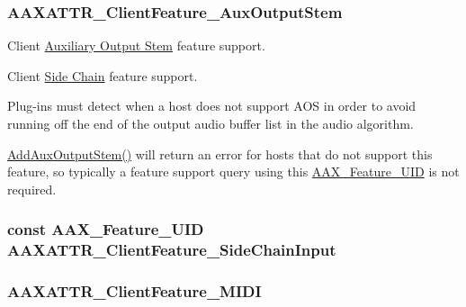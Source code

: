 \subsubsection[{A\+A\+X\+A\+T\+T\+R\+\_\+\+Client\+Feature\+\_\+\+Aux\+Output\+Stem}]{\setlength{\rightskip}{0pt plus 5cm}A\+A\+X\+A\+T\+T\+R\+\_\+\+Client\+Feature\+\_\+\+Aux\+Output\+Stem}\label{a00299_aa6369eb43ac68152d30ec665de5ea603}


Client \hyperlink{a00339}{Auxiliary Output Stem} feature support. 

Client \hyperlink{a00338}{Side Chain} feature support.

Plug-\/ins must detect when a host does not support A\+O\+S in order to avoid running off the end of the output audio buffer list in the audio algorithm.

\hyperlink{a00088_a76266e8a07ce20cdbe5721172c32a93d}{Add\+Aux\+Output\+Stem()} will return an error for hosts that do not support this feature, so typically a feature support query using this \hyperlink{a00299_a53d6cf8a08224b3e813333e411ce798e}{A\+A\+X\+\_\+\+Feature\+\_\+\+U\+I\+D} is not required. \hypertarget{a00299_ad130c555cc62e4fbc5c8101d8d10ae45}{}
\subsubsection[{A\+A\+X\+A\+T\+T\+R\+\_\+\+Client\+Feature\+\_\+\+Side\+Chain\+Input}]{\setlength{\rightskip}{0pt plus 5cm}const {\bf A\+A\+X\+\_\+\+Feature\+\_\+\+U\+I\+D} A\+A\+X\+A\+T\+T\+R\+\_\+\+Client\+Feature\+\_\+\+Side\+Chain\+Input}\label{a00299_ad130c555cc62e4fbc5c8101d8d10ae45}
\hypertarget{a00299_ab018f9c736d0ffd41f1f67e77fa96773}{}
\subsubsection[{A\+A\+X\+A\+T\+T\+R\+\_\+\+Client\+Feature\+\_\+\+M\+I\+D\+I}]{\setlength{\rightskip}{0pt plus 5cm}A\+A\+X\+A\+T\+T\+R\+\_\+\+Client\+Feature\+\_\+\+M\+I\+D\+I}\label{a00299_ab018f9c736d0ffd41f1f67e77fa96773}


